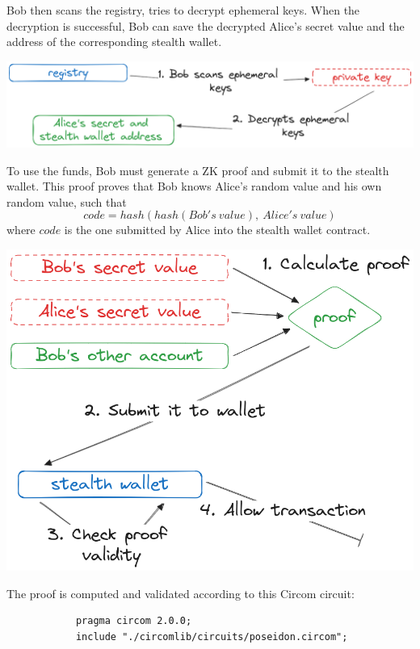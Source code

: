 \documentclass[portrait]{poster}
\begin{document}
\begin{multicols}{2}
    Bob then scans the registry, tries to decrypt ephemeral keys. When the
    decryption is successful, Bob can save the decrypted Alice's secret value
    and the address of the corresponding stealth wallet.

    \begin{center}\vspace{1cm}
        \centering
        \includegraphics[width=0.7\linewidth]{./assets/scanning-ephemeral-keys.png}
        \label{fig:scanning-ephemeral-keys}
    \end{center}\vspace{1cm}


    To use the funds, Bob must generate a ZK proof and submit it to the stealth
    wallet. This proof proves that Bob knows Alice's random value
    and his own random value, such that
    \[ code = hash(hash(Bob's\:value),\:Alice's\:value) \]
    where $code$ is the one submitted by Alice into the stealth wallet contract.

    \begin{center}\vspace{1cm}
        \centering
        \includegraphics[width=0.4\linewidth]{../iitsrc/assets/images/interating-with-wallet.png}
        \label{fig:wallet-interaction}
    \end{center}\vspace{1cm}

    The proof is computed and validated according to this Circom circuit:

    \begin{center}\vspace{1cm}
        \centering
        \begin{verbatim}
            pragma circom 2.0.0;
            include "./circomlib/circuits/poseidon.circom";


\end{verbatim}
\end{center}
\end{multicols}
\end{document}
